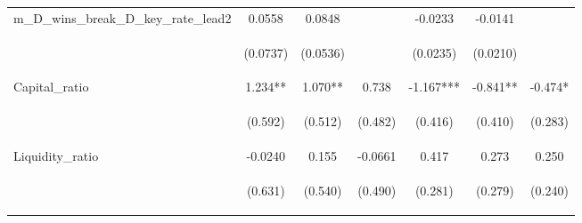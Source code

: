 \begin{tabular}{lcccccc}
m\_D\_wins\_break\_D\_key\_rate\_lead2 & 0.0558 & 0.0848 &  & -0.0233 & -0.0141 &  \\
\vspace{4pt} & \begin{footnotesize}(0.0737)\end{footnotesize} & \begin{footnotesize}(0.0536)\end{footnotesize} & \begin{footnotesize}\end{footnotesize} & \begin{footnotesize}(0.0235)\end{footnotesize} & \begin{footnotesize}(0.0210)\end{footnotesize} & \begin{footnotesize}\end{footnotesize} \\
Capital\_ratio & 1.234** & 1.070** & 0.738 & -1.167*** & -0.841** & -0.474* \\
\vspace{4pt} & \begin{footnotesize}(0.592)\end{footnotesize} & \begin{footnotesize}(0.512)\end{footnotesize} & \begin{footnotesize}(0.482)\end{footnotesize} & \begin{footnotesize}(0.416)\end{footnotesize} & \begin{footnotesize}(0.410)\end{footnotesize} & \begin{footnotesize}(0.283)\end{footnotesize} \\
Liquidity\_ratio & -0.0240 & 0.155 & -0.0661 & 0.417 & 0.273 & 0.250 \\
\vspace{4pt} & \begin{footnotesize}(0.631)\end{footnotesize} & \begin{footnotesize}(0.540)\end{footnotesize} & \begin{footnotesize}(0.490)\end{footnotesize} & \begin{footnotesize}(0.281)\end{footnotesize} & \begin{footnotesize}(0.279)\end{footnotesize} & \begin{footnotesize}(0.240)\end{footnotesize} \\

\end{tabular}
